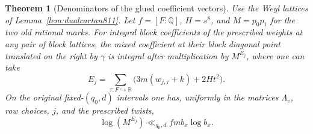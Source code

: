 \documentclass[a4paper,11pt]{article}
\newtheorem{theorem}[proposition]{Theorem}
\theoremstyle{definition}
\theoremstyle{remark}
\newcommand{\RR}{\mathbb R}\newcommand{\CC}{\mathbb C}\newcommand{\QQ}{\mathbb Q}
\numberwithin{equation}{section}
\begin{document}
\begin{theorem}[Denominators of the glued coefficient vectors]
\leavevmode\label{thm:gluedcost811}
Use the Weyl lattices of Lemma~\ref{lem:dualcartan811}. Let
\(f=[F:\QQ]\), \(H=s^8\), and \(M=p_0p_1\) for the two old
rational marks. For integral block coefficients of the
prescribed weights at any pair of block lattices, the mixed
coefficient at their block diagonal point translated on the
right by \(\gamma\) is integral after multiplication by
\(M^{E_j}\), where one can take
\[
       E_j=\sum_{\tau:F\hookrightarrow\RR}
                    \bigl(3m(w_{j,\tau}+k)+2Ht^2\bigr).
\]
On the original fixed-\((q_0,d)\) intervals one has, uniformly
in the matrices \(\Lambda_v\), row choices, \(j\), and the
prescribed twists,
\[
             \log(M^{E_j})\ll_{q_0,d} f m b_x\log b_x .
\]
\end{theorem}
\end{document}
